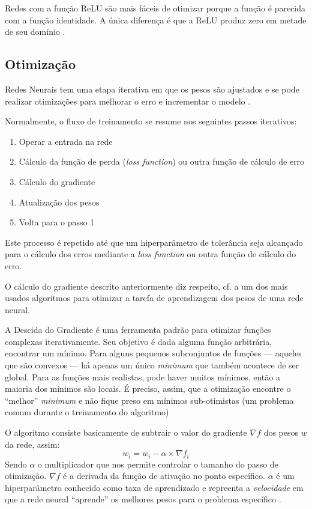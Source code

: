 Redes com a função ReLU são mais fáceis de otimizar porque a função é parecida com a função identidade. A única diferença é que a ReLU produz zero em metade de seu domínio \cite{hagan_neural_1996}.

\subsection{Otimização}\label{otimização}
Redes Neurais tem uma etapa iterativa em que os pesos são ajustados e se pode realizar otimizações para melhorar o erro e incrementar o modelo \cite{haykin_redes_2001}.

Normalmente, o fluxo de treinamento se resume nos seguintes passos iterativos:
\begin{enumerate}\label{fluxo_treinamento}
	\item Operar a entrada na rede
	\item Cálculo da função de perda (\textit{loss function}) ou outra função de cálculo de erro
	\item Cálculo do gradiente
	\item Atualização dos pesos
	\item Volta para o passo 1
\end{enumerate}

Este processo é repetido até que um hiperparâmetro de tolerância seja alcançado para o cálculo dos erros mediante a \textit{loss function} ou outra função de cálculo do erro.

O cálculo do gradiente descrito anteriormente diz respeito, cf.  a um dos mais usados algoritmos para otimizar a tarefa de aprendizagem dos pesos de uma rede neural.

A Descida do Gradiente é uma ferramenta padrão para otimizar funções complexas iterativamente. Seu objetivo é dada alguma função arbitrária, encontrar um mínimo. Para alguns pequenos subconjuntos de funções --- aqueles que são convexos --- há apenas um único \textit{minimum} que também acontece de ser global. Para as funções mais realistas, pode haver muitos mínimos, então a maioria dos mínimos são locais. É preciso, assim, que a otimização encontre o ``melhor'' \textit{minimum} e não fique preso em mínimos sub-otimistas (um problema comum durante o treinamento do algoritmo) \cite{deep_learning_book_2019}

O algoritmo consiste basicamente de subtrair o valor do gradiente $\nabla f$ dos pesos $w$ da rede, assim:
\begin{equation}\label{gradiente}
	w_i = w_i - \alpha \times \nabla f_i
\end{equation}
Sendo $\alpha$ o multiplicador que nos permite controlar o tamanho do passo de otimização.  $\nabla f$ é a derivada da função de ativação no ponto específico. $\alpha$ é um hiperparâmetro conhecido como taxa de aprendizado e repreenta a \textit{velocidade} em que a rede neural ``aprende'' os melhores pesos para o problema específico \cite{haykin_redes_2001}.

